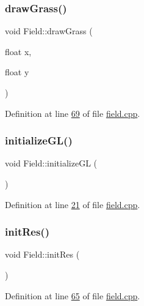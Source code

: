 \subsubsection{\texorpdfstring{draw\+Grass()}{drawGrass()}}
{\footnotesize\ttfamily void Field\+::draw\+Grass (\begin{DoxyParamCaption}\item[{float}]{x,  }\item[{float}]{y }\end{DoxyParamCaption})\hspace{0.3cm}{\ttfamily [protected]}}



Definition at line \hyperlink{a00071_source_l00069}{69} of file \hyperlink{a00071_source}{field.\+cpp}.

\mbox{\label{a00173_a38484502a93b5cd191d8ababc415e0cb}} 
\subsubsection{\texorpdfstring{initialize\+G\+L()}{initializeGL()}}
{\footnotesize\ttfamily void Field\+::initialize\+GL (\begin{DoxyParamCaption}{ }\end{DoxyParamCaption})\hspace{0.3cm}{\ttfamily [protected]}}



Definition at line \hyperlink{a00071_source_l00021}{21} of file \hyperlink{a00071_source}{field.\+cpp}.

\mbox{\label{a00173_ac2d8f10e9bccfe3cf51cf534c73cecd4}} 
\subsubsection{\texorpdfstring{init\+Res()}{initRes()}}
{\footnotesize\ttfamily void Field\+::init\+Res (\begin{DoxyParamCaption}{ }\end{DoxyParamCaption})\hspace{0.3cm}{\ttfamily [protected]}}



Definition at line \hyperlink{a00071_source_l00065}{65} of file \hyperlink{a00071_source}{field.\+cpp}.

